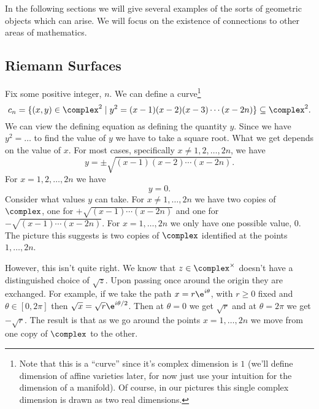 \documentclass[fleqn]{NotesClass}
\begin{document}
    In the following sections we will give several examples of the sorts of geometric objects which can arise.
    We will focus on the existence of connections to other areas of mathematics.
    
    \subsection{Riemann Surfaces}
    Fix some positive integer, \(n\).
    We can define a curve\footnote{Note that this is a \enquote{curve} since it's complex dimension is \(1\) (we'll define dimension of affine varieties later, for now just use your intuition for the dimension of a manifold). Of course, in our pictures this single complex dimension is drawn as two real dimensions.}
    \begin{equation}
        c_n = \{(x, y) \in \complex^2 \mid y^2 = (x - 1)(x - 2)(x - 3) \dotsm (x - 2n)\} \subseteq \complex^2.
    \end{equation}
    We can view the defining equation as defining the quantity \(y\).
    Since we have \(y^2 = \dotso\) to find the value of \(y\) we have to take a square root.
    What we get depends on the value of \(x\).
    For most cases, specifically \(x \ne 1, 2, \dotsc, 2n\), we have
    \begin{equation}
        y = \pm \sqrt{(x - 1)(x - 2) \dotsm (x - 2n)}.
    \end{equation}
    For \(x = 1, 2, \dotsc, 2n\) we have
    \begin{equation}
        y = 0.
    \end{equation}
    Consider what values \(y\) can take.
    For \(x \ne 1, \dotsc, 2n\) we have two copies of \(\complex\), one for \(+ \sqrt{(x-1) \dotsm (x - 2n)}\) and one for \(-\sqrt{(x - 1) \dotsm (x - 2n)}\).
    For \(x = 1, \dotsc, 2n\) we only have one possible value, \(0\).
    The picture this suggests is two copies of \(\complex\) identified at the points \(1, \dotsc, 2n\).
    
    However, this isn't quite right.
    We know that \(z \in \complex^{\times}\) doesn't have a distinguished choice of \(\sqrt{z}\).
    Upon passing once around the origin they are exchanged.
    For example, if we take the path \(x = r\e^{i\theta}\), with \(r \ge 0\) fixed and \(\theta \in [0, 2\pi]\) then \(\sqrt{x} = \sqrt{r} \e^{i\theta/2}\).
    Then at \(\theta = 0\) we get \(\sqrt{r}\) and at \(\theta = 2\pi\) we get \(-\sqrt{r}\).
    The result is that as we go around the points \(x = 1, \dotsc, 2n\) we move from one copy of \(\complex\) to the other.
    
\end{document}
